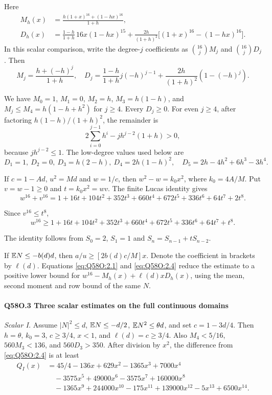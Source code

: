 Here
\[
\begin{aligned}
M_h(x)&=\frac{h(1+x)^{16}+(1-hx)^{16}}{1+h},\\
D_h(x)&=\frac{1-h}{1+h}\,16x(1-hx)^{15}
+\frac{2h}{(1+h)^2}\bigl[(1+x)^{16}-(1-hx)^{16}\bigr].
\end{aligned}
\]
In this scalar comparison, write the degree-\(j\) coefficients as
\(\binom{16}{j}M_j\) and \(\binom{16}{j}D_j\). Then
\[
M_j=\frac{h+(-h)^j}{1+h},\quad
D_j=\frac{1-h}{1+h}j(-h)^{j-1}
+\frac{2h}{(1+h)^2}(1-(-h)^j).
\tag{Q58O.2.2}\label{eq:Q58O:2.2}
\]

We have \(M_0=\allowbreak 1\), \(M_1=\allowbreak 0\), \(M_2=\allowbreak h\), \(M_3=\allowbreak h(1-h)\), and
\(M_j\le\allowbreak  M_4=\allowbreak h(1-h+h^2)\) for \(j\ge\allowbreak 4\).
Every \(D_j\ge\allowbreak 0\). For even \(j\ge\allowbreak 4\), after factoring
\(h(1-h)/(1+h)^2\), the remainder is
\[
2\sum_{i=0}^{j-1}h^i-jh^{j-2}(1+h)>0,
\]
because \(jh^{j-2}\le\allowbreak 1\).
The low-degree values used below are
\[
D_1=1,\ D_2=0,\ D_3=h(2-h),\ D_4=2h(1-h)^2,
\quad D_5=2h-4h^2+6h^3-3h^4.
\tag{Q58O.2.3}\label{eq:Q58O:2.3}
\]


If \(c=\allowbreak 1-Ad\), \(u^2=\allowbreak Md\) and \(w=\allowbreak 1/c\), then
\(w^2-w=\allowbreak k_0x^2\), where \(k_0=\allowbreak 4A/M\).
Put \(v=\allowbreak w-1\ge\allowbreak 0\) and \(t=\allowbreak k_0x^2=\allowbreak wv\). The finite Lucas identity gives
\[
w^{16}+v^{16}=1+16t+104t^2+352t^3+660t^4
+672t^5+336t^6+64t^7+2t^8.
\]

Since \(v^{16}\le\allowbreak  t^8\),
\[
w^{16}\ge1+16t+104t^2+352t^3+660t^4
+672t^5+336t^6+64t^7+t^8.
\tag{Q58O.2.4}\label{eq:Q58O:2.4}
\]

The identity follows from \(S_0=\allowbreak 2\), \(S_1=\allowbreak 1\) and
\(S_n=\allowbreak S_{n-1}+tS_{n-2}\).

If \(\mathbb E N\le\allowbreak -b(d)d\), then
\(a/u\ge\allowbreak [2b(d)c/M]x\). Denote the coefficient in brackets by \(\ell(d)\).
Equations \eqref{eq:Q58O:2.1} and \eqref{eq:Q58O:2.4} reduce the estimate to a positive lower bound for
\(w^{16}-M_h(x)+\ell(d)xD_h(x)\), using the mean, second moment and row bound of the same \(N\).

\paragraph{Q58O.3 Three scalar estimates on the full continuous domains}
\emph{Scalar I.}
Assume \(|N|^2\le\allowbreak  d\), \(\mathbb E N\le\allowbreak -d/2\), \(\mathbb E N^2\le\allowbreak \theta d\), and set \(c=\allowbreak 1-3d/4\).
Then \(h=\allowbreak \theta\), \(k_0=\allowbreak 3\), \(c\ge\allowbreak 3/4\), \(x<\allowbreak 1\), and
\(\ell(d)=\allowbreak c\ge\allowbreak 3/4\).
Also \(M_4<\allowbreak 5/16\), \(560M_3<\allowbreak 136\), and \(560D_3>\allowbreak 350\).
After division by \(x^2\), the difference from \eqref{eq:Q58O:2.4} is at least
\[
\begin{aligned}
Q_I(x)&=45/4-136x+629x^2-1365x^3+7000x^4\\
&\quad -3575x^5+49000x^6-3575x^7+160000x^8\\
&\quad -1365x^9+244000x^{10}-175x^{11}+139000x^{12}-5x^{13}+6500x^{14}.
\end{aligned}
\]

